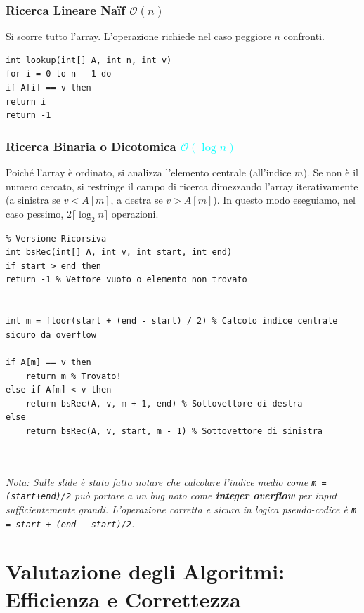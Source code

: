 \documentclass[12pt, a4paper]{article}
\begin{document}
\subsubsection{Ricerca Lineare Naïf \texorpdfstring{$\mathcal{O}(n)$}{O(n)}}
Si scorre tutto l'array. L'operazione richiede nel caso peggiore $n$ confronti.

\begin{verbatim}
int lookup(int[] A, int n, int v)
for i = 0 to n - 1 do
if A[i] == v then
return i
return -1
\end{verbatim}

\subsubsection{Ricerca Binaria o Dicotomica \textcolor{cyan}{\texorpdfstring{$\mathcal{O}(\log n)$}{O(log n)}}}
Poiché l'array è ordinato, si analizza l'elemento centrale (all'indice $m$). Se non è il numero cercato, si restringe il campo di ricerca dimezzando l'array iterativamente (a sinistra se $v < A[m]$, a destra se $v > A[m]$). In questo modo eseguiamo, nel caso pessimo, $2 \lceil \log_2 n \rceil$ operazioni.

\begin{verbatim}
% Versione Ricorsiva
int bsRec(int[] A, int v, int start, int end)
if start > end then
return -1 % Vettore vuoto o elemento non trovato


int m = floor(start + (end - start) / 2) % Calcolo indice centrale sicuro da overflow

if A[m] == v then
    return m % Trovato!
else if A[m] < v then
    return bsRec(A, v, m + 1, end) % Sottovettore di destra
else
    return bsRec(A, v, start, m - 1) % Sottovettore di sinistra



\end{verbatim}

\textit{Nota: Sulle slide è stato fatto notare che calcolare l'indice medio come
\texttt{m = (start+end)/2} può portare a un bug noto come
\textbf{integer overflow} per input sufficientemente grandi.
L'operazione corretta e sicura in logica pseudo-codice è
\texttt{m = start + (end - start)/2}.}


\newpage

\section{Valutazione degli Algoritmi: Efficienza e Correttezza}
\end{document}
